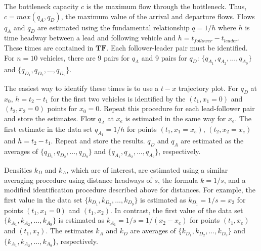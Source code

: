 \documentclass[Proceedings]{ascelike}
\begin{document}
The bottleneck capacity $c$ is the maximum flow through the bottleneck. Thus, $c = max(q_A,q_D)$, the maximum value of the arrival and departure flows.  Flows $q_A$ and  $q_D$ are estimated using the fundamental relationship $q = 1/h$ where $h$ is time headway between a lead and following vehicle and $h = t_{follower} - t_{leader}$. These times are contained in  $\mathbf{TF}$. Each follower-leader pair must be identified. For $n = 10$ vehicles, there are 9 pairs for $q_A$  and 9 pairs for $q_D$:  $\{q_{A_1},q_{A_2},\ldots,q_{A_9}\}$ and $\{q_{D_1},q_{D_2},\ldots,q_{D_9}\}$.

The easiest way to identify these times is to use a $t-x$ trajectory plot. For $q_D$ at $x_0$, $h = t_2 - t_1$ for the first two vehicles is  identified by the $(t_1, x_1 = 0)$ and $(t_2, x_2 = 0)$ points for  $x_0 = 0$.    Repeat this procedure for each lead-follower pair and store the estimates. Flow $q_A$ at $x_e$ is estimated in the same way for $x_e$. The first estimate in the data set   $q_{A _1 } = 1/h $ for points $(t_1, x_1 = x_e)$, $(t_2, x_2 = x_e)$ and $h = t_2 - t_1$. Repeat and store the results. $q_D$ and $q_A$ are estimated as the averages of  $\{q_{D_1},q_{D_2},\ldots,q_{D_9}\}$ and $\{q_{A_1},q_{A_2},\ldots,q_{A_9}\}$, respectively.
 
Densities $k_D$ and $k_A$, which are of interest, are estimated using a similar averaging procedure using distance headways of $s$, the formula $k = 1/s$, and a modified identification procedure described above for distances. For example,  the first value in the data set $\{k_{D_1},k_{D_2},\ldots,k_{D_9}\}$   is estimated as $k_{D_1} = 1/s = x_2$ for points $(t_1, x_1 = 0)$ and $(t_1,  x_2)$. In contrast, the first value of the data set  $\{k_{A_1},k_{A_2},\ldots,k_{A_9}\}$ is estimated as $k_{A_1} = 1/s = 1/( x_2 - x_e)$ for points $(t_1,  x_e)$ and $(t_1,  x_2)$. The estimates $k_A$ and $k_D$ are averages of $\{k_{D_1},k_{D_2},\ldots,k_{D_9}\}$ and $\{k_{A_1},k_{A_2},\ldots,k_{A_9}\}$, respectively.
\end{document}
